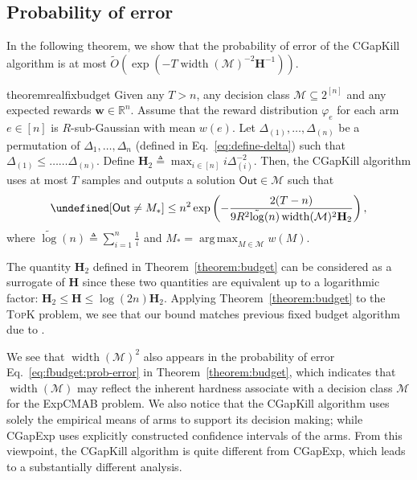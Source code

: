 \documentclass{article}
\newcommand{\Algorithm}{{\small \textsf{CGapExp}}\xspace}
\newcommand{\AlgorithmBud}{{\small \textsf{CGapKill}}\xspace}
\newcommand{\Problem}{{\small \textsf{ExpCMAB}}\xspace}
\newcommand{\Rew}{\varphi}
\newcommand{\M}{\mathcal M}
\newcommand{\RR}{\mathbb R}
\DeclareMathOperator{\rank}{width}
\DeclareMathOperator*{\argmax}{arg\,max}
\newcommand{\out}{\mathsf{Out}}
\newcommand{\barlog}{\tilde{\log}}
\let\Pr\undefined
\DeclareMathOperator{\Pr}{Pr}
\newcommand{\MultiIdent}{\textsc{TopK}\xspace}
\renewcommand{\vec}[1]{\boldsymbol{#1}}
\begin{document}
\subsection{Probability of error}
In the following theorem, we show that the probability of error of the \AlgorithmBud algorithm is at most $\tilde O(\exp(-T\rank(\M)^{-2} \mathbf H^{-1}))$.
\begin{restatable}{theorem}{realfixbudget}
Given any $T>n$, any decision class $\M \subseteq 2^{[n]}$ and any expected rewards $\vec w \in \RR^{n}$.
Assume that the reward distribution $\Rew_e$ for each arm $e\in [n]$ is  $R$-sub-Gaussian with mean $w(e)$.
Let $\Delta_{(1)},\ldots,\Delta_{(n)}$ be a permutation of $\Delta_1,\ldots,\Delta_n$ (defined in Eq.~\eqref{eq:define-delta}) such that
$\Delta_{(1)} \le \ldots \ldots \Delta_{(n)}$. 
Define $\mathbf H_2 \triangleq \max_{i\in[n]} i\Delta_{(i)}^{-2}$.
Then, the \AlgorithmBud algorithm uses at most $T$ samples and outputs a solution $\out \in \M$ such that
\begin{equation}
\Pr[\out\not=M_*] \le n^2  \exp\left(-\frac{2(T-n)}{9R^2 \barlog(n) \rank(\M)^2 \mathbf H_2} \right),
\label{eq:fbudget:prob-error}
\end{equation}
where $\barlog(n)\triangleq \sum_{i=1}^n \frac1i$ and $M_* = \argmax_{M\in \M} w(M)$.
\label{theorem:budget}
\end{restatable}
The quantity $\mathbf H_2$ defined in Theorem~\ref{theorem:budget} can be considered as a surrogate of $\mathbf H$ since these two quantities are equivalent up to a logarithmic factor: $\mathbf H_2 \le \mathbf H \le \log(2n) \mathbf H_2$.
Applying Theorem~\ref{theorem:budget} to the \MultiIdent problem, we see that our bound matches previous fixed budget algorithm due to \citet{bubeck2013multiple}.

We see that $\rank(\M)^2$ also appears in the probability of error Eq.~\eqref{eq:fbudget:prob-error} in Theorem~\ref{theorem:budget}, which indicates that $\rank(\M)$ may reflect the inherent hardness associate with a decision class $\M$ for the \Problem problem.
We also notice that the \AlgorithmBud algorithm uses solely the empirical means of arms to support its decision making; while \Algorithm uses explicitly constructed confidence intervals of the arms.
From this viewpoint, the \AlgorithmBud algorithm is quite different from \Algorithm, which leads to a substantially different analysis.
\end{document}
